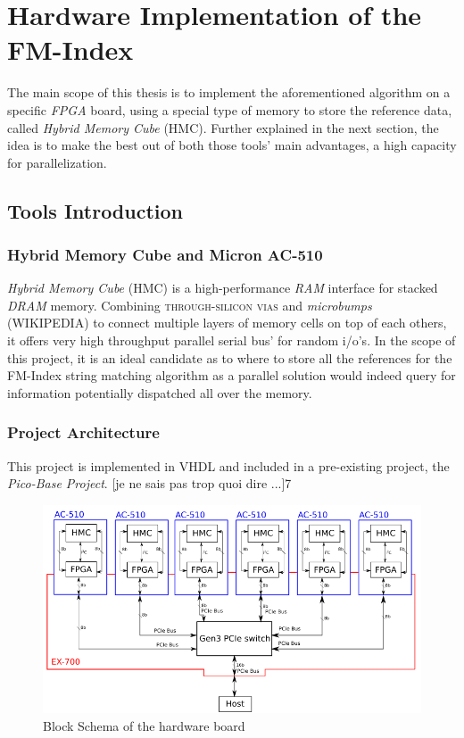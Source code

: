 
\chapter{Hardware Implementation of the FM-Index} %

\label{Chapter3} %
The main scope of this thesis is to implement the aforementioned algorithm on a specific \textsl{FPGA} board, using a special type of memory to store the reference data, called \textsl{Hybrid Memory Cube} (HMC). Further explained in the next section, the idea is to make the best out of both those tools' main advantages, a high capacity for parallelization.


\section{Tools Introduction}

\subsection{Hybrid Memory Cube and Micron AC-510}


\textsl{Hybrid Memory Cube} (HMC) is a high-performance \textsl{RAM} interface for stacked \textsl{DRAM} memory. Combining \textsc{through-silicon vias} and \textsl{microbumps} (WIKIPEDIA) to connect multiple layers of memory cells on top of each others, it offers very high throughput parallel serial bus' for random i/o's. In the scope of this project, it is an ideal candidate as to where to store all the references for the  FM-Index string matching algorithm as a parallel solution would indeed query for information potentially dispatched all over the memory.


\subsection{Project Architecture}

This project is implemented in VHDL and included in a pre-existing project, the \textsl{Pico-Base Project}. [je ne sais pas trop quoi dire ...]7

\begin{figure}[H]
    \centering
    \includegraphics[scale = 0.5]{Figures/pico_board.png}
    \caption{Block Schema of the hardware board}
    \label{fig:my_label}
\end{figure}

